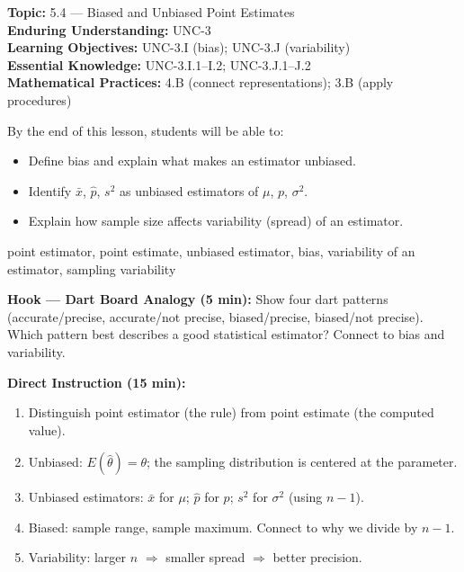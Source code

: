 \documentclass[10pt]{article}
\begin{document}

\begin{objectivebox}
\textbf{Topic:} 5.4 — Biased and Unbiased Point Estimates\\
\textbf{Enduring Understanding:} UNC-3\\
\textbf{Learning Objectives:} UNC-3.I (bias); UNC-3.J (variability)\\
\textbf{Essential Knowledge:} UNC-3.I.1--I.2; UNC-3.J.1--J.2\\
\textbf{Mathematical Practices:} 4.B (connect representations); 3.B (apply procedures)
\end{objectivebox}

\begin{learningtargetbox}
By the end of this lesson, students will be able to:
\begin{itemize}
  \item Define bias and explain what makes an estimator unbiased.
  \item Identify $\bar{x}$, $\hat{p}$, $s^2$ as unbiased estimators of $\mu$, $p$, $\sigma^2$.
  \item Explain how sample size affects variability (spread) of an estimator.
\end{itemize}
\end{learningtargetbox}

\begin{vocabbox}
point estimator, point estimate, unbiased estimator, bias, variability of an estimator, sampling variability
\end{vocabbox}

\begin{hookbox}
\textbf{Hook — Dart Board Analogy (5 min):} Show four dart patterns (accurate/precise, accurate/not precise, biased/precise, biased/not precise). Which pattern best describes a good statistical estimator? Connect to bias and variability.
\end{hookbox}

\begin{notesbox}
\textbf{Direct Instruction (15 min):}
\begin{enumerate}
  \item Distinguish point estimator (the rule) from point estimate (the computed value).
  \item Unbiased: $E(\hat{\theta}) = \theta$; the sampling distribution is centered at the parameter.
  \item Unbiased estimators: $\bar{x}$ for $\mu$; $\hat{p}$ for $p$; $s^2$ for $\sigma^2$ (using $n-1$).
  \item Biased: sample range, sample maximum. Connect to why we divide by $n-1$.
  \item Variability: larger $n$ $\Rightarrow$ smaller spread $\Rightarrow$ better precision.
\end{enumerate}
\end{notesbox}
\end{document}
